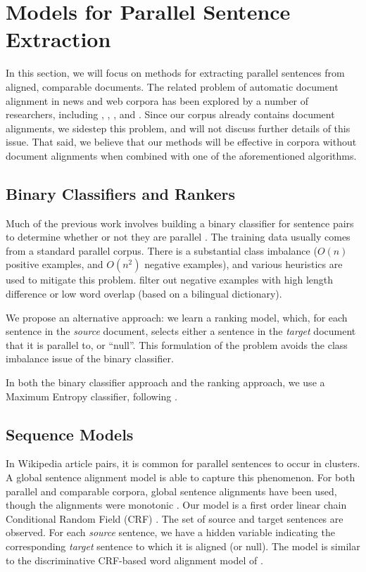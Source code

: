 \section{Models for Parallel Sentence Extraction}
\label{sec:models} In this section, we will focus on methods for
extracting parallel sentences from aligned, comparable documents.
The related problem of automatic document alignment in news and
web corpora has been explored by a number of researchers,
including
\citet{Resnik03}, \citet{Munteanu05},
\citet{Tillmann09a}, and \citet{Tillmann09b}.
Since our corpus already contains document alignments, we sidestep
this problem, and will not discuss further details of this issue.
That said, we believe that our methods will be effective in
corpora without document alignments when combined with one of the
aforementioned algorithms.


\subsection{Binary Classifiers and Rankers}
Much of the previous work involves building a binary classifier for sentence
pairs to determine whether or not they are parallel
\citep{Munteanu05,Tillmann09a}.
The training data usually comes from a standard parallel corpus.  There is a
substantial class imbalance ($O(n)$ positive examples, and $O(n^2)$
negative examples), and various heuristics are used to mitigate this problem.
\citet{Munteanu05} filter out negative
examples with high length difference or low word overlap (based on a bilingual
dictionary).

We propose an alternative approach: we learn a ranking model, which, for each sentence in the {\em
source} document, selects either a sentence in the {\em target} document that it is
parallel to, or ``null''.
This formulation of the problem avoids the class imbalance issue of the binary classifier.

In both the binary classifier approach and the ranking approach, we use a Maximum Entropy
classifier, following \citet{Munteanu05}.

\subsection{Sequence Models}
In Wikipedia article pairs, it is common for parallel sentences to
occur in clusters.  A global sentence alignment model is
able to capture this phenomenon. For both parallel and comparable
corpora, global sentence alignments have been used, though the
alignments were monotonic
\citep{Gale93,Moore02,Zhao02}.
Our model is a first order linear chain Conditional Random Field
(CRF) \citep{Lafferty01}. The set of source and
target sentences are observed. For each {\em source} sentence, we
have a hidden variable indicating the corresponding {\em target}
sentence to which it is aligned (or null). The model is similar to the
discriminative CRF-based word alignment model of
\citep{Blunsom06}.

